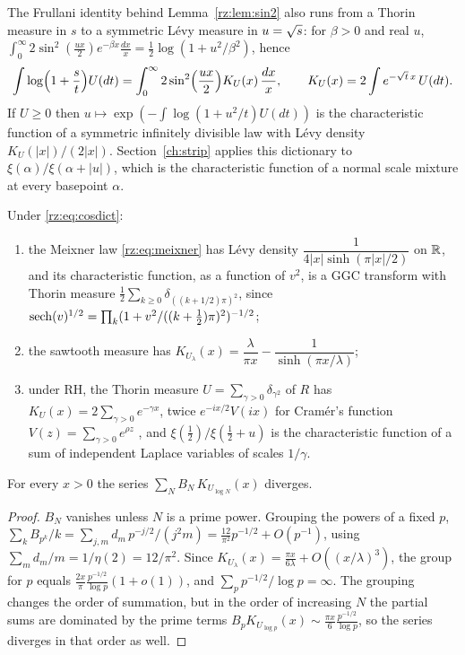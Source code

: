 The Frullani identity behind Lemma~\ref{rz:lem:sin2} also runs from a Thorin measure in $s$ to a symmetric L\'evy measure in $u=\sqrt{s}$: for $\beta>0$ and real $u$, $\int_0^\infty2\sin^2(\frac{ux}2)e^{-\beta x}\frac{dx}x=\frac12\log(1+u^2/\beta^2)$, hence
\begin{equation}\label{rz:eq:cosdict}
\int\log\Bigl(1+\frac st\Bigr)U(dt)=\int_0^\infty2\sin^2\Bigl(\frac{ux}2\Bigr)K_U(x)\,\frac{dx}x,\qquad K_U(x)=2\int e^{-\sqrt t\,x}\,U(dt).
\end{equation}
If $U\ge0$ then $u\mapsto\exp(-\int\log(1+u^2/t)U(dt))$ is the characteristic function of a symmetric infinitely divisible law with L\'evy density $K_U(|x|)/(2|x|)$. Section~\ref{ch:strip} applies this dictionary to $\xi(\alpha)/\xi(\alpha+|u|)$, which is the characteristic function of a normal scale mixture at every basepoint $\alpha$.

\begin{proposition}\label{rz:prop:dict}
Under \eqref{rz:eq:cosdict}:
\begin{enumerate}
\item[(i)] the Meixner law \eqref{rz:eq:meixner} has L\'evy density $\dfrac{1}{4|x|\sinh(\pi|x|/2)}$ on $\mathbb{R}$, and its characteristic function, as a function of $v^2$, is a GGC transform with Thorin measure $\frac12\sum_{k\ge0}\delta_{((k+1/2)\pi)^2}$, since $\operatorname{sech}(v)^{1/2}=\prod_k(1+v^2/((k+\frac12)\pi)^2)^{-1/2}$;
\item[(ii)] the sawtooth measure has $K_{U_\lambda}(x)=\dfrac{\lambda}{\pi x}-\dfrac{1}{\sinh(\pi x/\lambda)}$;
\item[(iii)] under RH, the Thorin measure $U=\sum_{\gamma>0}\delta_{\gamma^2}$ of $R$ has $K_U(x)=2\sum_{\gamma>0}e^{-\gamma x}$, twice $e^{-ix/2}V(ix)$ for Cram\'er's function $V(z)=\sum_{\gamma>0}e^{\rho z}$ \cite{Cramer19}, and $\xi(\frac12)/\xi(\frac12+u)$ is the characteristic function of a sum of independent Laplace variables of scales $1/\gamma$.
\end{enumerate}
\end{proposition}

\begin{proposition}\label{rz:prop:diverge}
For every $x>0$ the series $\sum_NB_N\,K_{U_{\log N}}(x)$ diverges.
\end{proposition}

\begin{proof}
$B_N$ vanishes unless $N$ is a prime power. Grouping the powers of a fixed $p$, $\sum_kB_{p^k}/k=\sum_{j,m}d_m\,p^{-j/2}/(j^2m)=\frac{12}{\pi^2}p^{-1/2}+O(p^{-1})$, using $\sum_md_m/m=1/\eta(2)=12/\pi^2$. Since $K_{U_\lambda}(x)=\frac{\pi x}{6\lambda}+O((x/\lambda)^3)$, the group for $p$ equals $\frac{2x}{\pi}\frac{p^{-1/2}}{\log p}(1+o(1))$, and $\sum_pp^{-1/2}/\log p=\infty$. The grouping changes the order of summation, but in the order of increasing $N$ the partial sums are dominated by the prime terms $B_pK_{U_{\log p}}(x)\sim\frac{\pi x}{6}\frac{p^{-1/2}}{\log p}$, so the series diverges in that order as well.
\end{proof}


